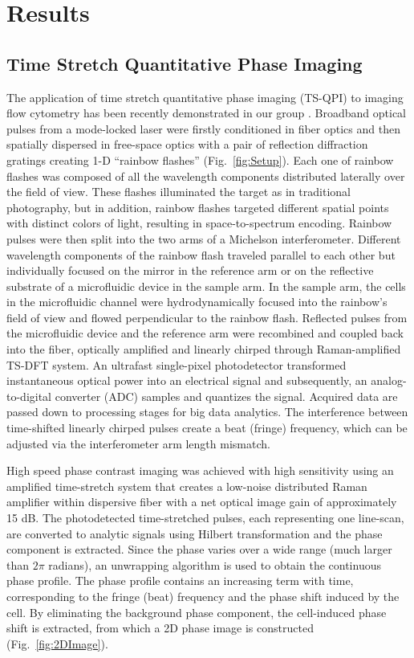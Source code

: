 \documentclass[aps,pra,reprint,superscriptaddress]{revtex4-1}
\begin{document}
\section{Results}
\subsection{Time Stretch Quantitative Phase Imaging}

The application of time stretch quantitative phase imaging (TS-QPI) to imaging flow cytometry has been recently demonstrated in our group \cite{mahjoubfar2013label}. Broadband optical pulses from a mode-locked laser were firstly conditioned in fiber optics and then spatially dispersed in free-space optics with a pair of reflection diffraction gratings creating 1-D ``rainbow flashes'' (Fig.~\ref{fig:Setup}). Each one of rainbow flashes was composed of all the wavelength components distributed laterally over the field of view. These flashes illuminated the target as in traditional photography, but in addition, rainbow flashes targeted different spatial points with distinct colors of light, resulting in space-to-spectrum encoding. Rainbow pulses were then split into the two arms of a Michelson interferometer. Different wavelength components of the rainbow flash traveled parallel to each other but individually focused on the mirror in the reference arm or on the reflective substrate of a microfluidic device in the sample arm. In the sample arm, the cells in the microfluidic channel were hydrodynamically focused \cite{knight1998hydrodynamic,lee2006hydrodynamic} into the rainbow's field of view and flowed perpendicular to the rainbow flash. Reflected pulses from the microfluidic device and the reference arm were recombined and coupled back into the fiber, optically amplified and linearly chirped through Raman-amplified TS-DFT system. An ultrafast single-pixel photodetector  transformed instantaneous optical power into an electrical signal and subsequently, an analog-to-digital converter (ADC) samples and quantizes the signal. Acquired data are passed down to processing stages for big data analytics. The interference between time-shifted linearly chirped pulses create a beat (fringe) frequency, which can be adjusted via the interferometer arm length mismatch.

High speed phase contrast imaging was achieved with high sensitivity using an amplified time-stretch system that creates a low-noise distributed Raman amplifier within dispersive fiber with a net optical image gain of approximately 15 dB. The photodetected time-stretched pulses, each representing one line-scan, are converted to analytic signals using Hilbert transformation \cite{king2009hilbert} and the phase component is extracted. Since the phase varies over a wide range (much larger than $2 \pi$ radians), an unwrapping algorithm is used to obtain the continuous phase profile. The phase profile contains an increasing term with time, corresponding to the fringe (beat) frequency and the phase shift induced by the cell. By eliminating the background phase component, the cell-induced phase shift is extracted, from which a 2D phase image is constructed (Fig.~\ref{fig:2DImage}).
\end{document}
